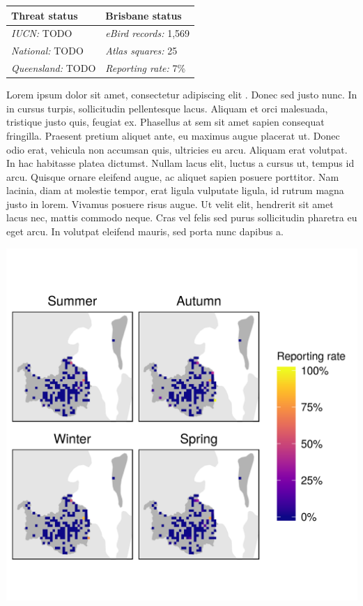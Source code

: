 \documentclass[12pt,openany,oneside]{book}
\theoremstyle{definition}
\theoremstyle{definition}
\theoremstyle{definition}
\theoremstyle{remark}
\begin{document}
\begin{tabu} to 
\toprule
Threat status & Brisbane status\\
\midrule
\textit{IUCN:} TODO & \textit{eBird records:} 1,569\\
\textit{National:} TODO & \textit{Atlas squares:} 25\\
\textit{Queensland:} TODO & \textit{Reporting rate:} 7\%\\
\bottomrule
\end{tabu}

Lorem ipsum dolor sit amet, consectetur adipiscing elit
\citep{rexample1, rexample2, rexample3}. Donec sed justo nunc. In in
cursus turpis, sollicitudin pellentesque lacus. Aliquam et orci
malesuada, tristique justo quis, feugiat ex. Phasellus at sem sit amet
sapien consequat fringilla. Praesent pretium aliquet ante, eu maximus
augue placerat ut. Donec odio erat, vehicula non accumsan quis,
ultricies eu arcu. Aliquam erat volutpat. In hac habitasse platea
dictumst. Nullam lacus elit, luctus a cursus ut, tempus id arcu. Quisque
ornare eleifend augue, ac aliquet sapien posuere porttitor. Nam lacinia,
diam at molestie tempor, erat ligula vulputate ligula, id rutrum magna
justo in lorem. Vivamus posuere risus augue. Ut velit elit, hendrerit
sit amet lacus nec, mattis commodo neque. Cras vel felis sed purus
sollicitudin pharetra eu eget arcu. In volutpat eleifend mauris, sed
porta nunc dapibus a.

\includegraphics{assets/maps/Dendrocygna-arcuata.png}
\end{document}
